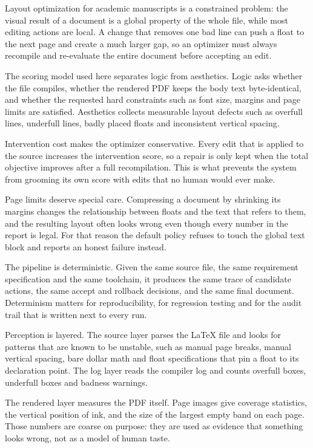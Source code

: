 \documentclass[10pt,a4paper]{article}
\begin{document}
Layout optimization for academic manuscripts is a constrained problem: the visual result of a document is a global property of the whole file, while most editing actions are local. A change that removes one bad line can push a float to the next page and create a much larger gap, so an optimizer must always recompile and re-evaluate the entire document before accepting an edit.

The scoring model used here separates logic from aesthetics. Logic asks whether the file compiles, whether the rendered PDF keeps the body text byte-identical, and whether the requested hard constraints such as font size, margins and page limits are satisfied. Aesthetics collects measurable layout defects such as overfull lines, underfull lines, badly placed floats and inconsistent vertical spacing.

Intervention cost makes the optimizer conservative. Every edit that is applied to the source increases the intervention score, so a repair is only kept when the total objective improves after a full recompilation. This is what prevents the system from grooming its own score with edits that no human would ever make.

Page limits deserve special care. Compressing a document by shrinking its margins changes the relationship between floats and the text that refers to them, and the resulting layout often looks wrong even though every number in the report is legal. For that reason the default policy refuses to touch the global text block and reports an honest failure instead.

The pipeline is deterministic. Given the same source file, the same requirement specification and the same toolchain, it produces the same trace of candidate actions, the same accept and rollback decisions, and the same final document. Determinism matters for reproducibility, for regression testing and for the audit trail that is written next to every run.

Perception is layered. The source layer parses the LaTeX file and looks for patterns that are known to be unstable, such as manual page breaks, manual vertical spacing, bare dollar math and float specifications that pin a float to its declaration point. The log layer reads the compiler log and counts overfull boxes, underfull boxes and badness warnings.

The rendered layer measures the PDF itself. Page images give coverage statistics, the vertical position of ink, and the size of the largest empty band on each page. Those numbers are coarse on purpose: they are used as evidence that something looks wrong, not as a model of human taste.
\end{document}
